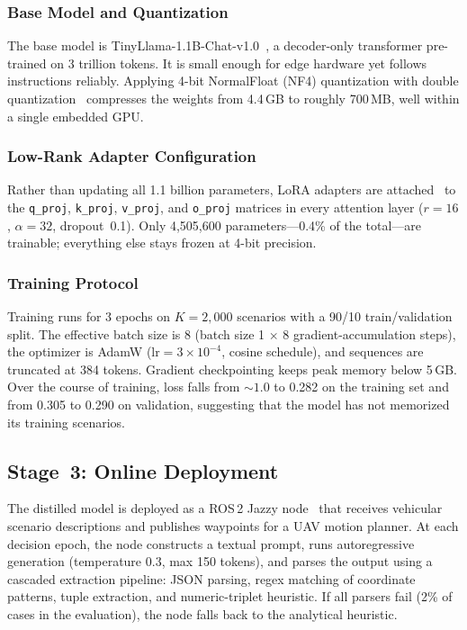 \documentclass[journal]{IEEEtran}
\begin{document}
\subsubsection{Base Model and Quantization}

The base model is TinyLlama-1.1B-Chat-v1.0~\cite{zhang2024tinyllama}, a decoder-only transformer pre-trained on 3 trillion tokens. It is small enough for edge hardware yet follows instructions reliably. Applying 4-bit NormalFloat (NF4) quantization with double quantization~\cite{dettmers2023qlora} compresses the weights from 4.4\,GB to roughly 700\,MB, well within a single embedded GPU.

\subsubsection{Low-Rank Adapter Configuration}

Rather than updating all 1.1 billion parameters, LoRA adapters are attached~\cite{hu2022lora} to the \texttt{q\_proj}, \texttt{k\_proj}, \texttt{v\_proj}, and \texttt{o\_proj} matrices in every attention layer ($r{=}16$, $\alpha{=}32$, dropout~0.1). Only 4{,}505{,}600 parameters---0.4\% of the total---are trainable; everything else stays frozen at 4-bit precision.

\subsubsection{Training Protocol}

Training runs for 3 epochs on $K = 2{,}000$ scenarios with a 90/10 train/validation split. The effective batch size is 8 (batch size 1 $\times$ 8 gradient-accumulation steps), the optimizer is AdamW ($\text{lr} = 3{\times}10^{-4}$, cosine schedule), and sequences are truncated at 384 tokens. Gradient checkpointing keeps peak memory below 5\,GB. Over the course of training, loss falls from ${\sim}1.0$ to 0.282 on the training set and from 0.305 to 0.290 on validation, suggesting that the model has not memorized its training scenarios.

\subsection{Stage~3: Online Deployment}

The distilled model is deployed as a ROS\,2 Jazzy node~\cite{macenski2022ros2} that receives vehicular scenario descriptions and publishes waypoints for a UAV motion planner. At each decision epoch, the node constructs a textual prompt, runs autoregressive generation (temperature 0.3, max 150 tokens), and parses the output using a cascaded extraction pipeline: JSON parsing, regex matching of coordinate patterns, tuple extraction, and numeric-triplet heuristic. If all parsers fail (2\% of cases in the evaluation), the node falls back to the analytical heuristic.
\end{document}
